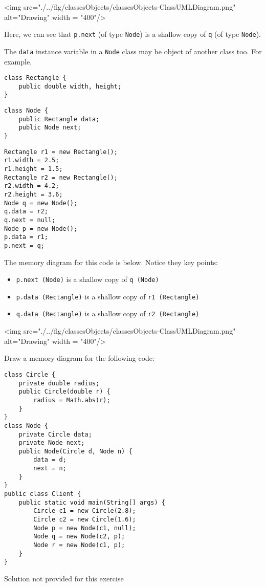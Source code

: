 \begin{center}
<img src="./../fig/classesObjects/classesObjects-ClassUMLDiagram.png" alt="Drawing" width = "400"/>
\end{center}

Here, we can see that \texttt{p.next} (of type \texttt{Node}) is a shallow copy of \texttt{q} (of type \texttt{Node}).

The \texttt{data} instance variable in a \texttt{Node} class may be object of another class too. For example,

\begin{lstlisting}
class Rectangle {
	public double width, height;
}  
\end{lstlisting}

\begin{lstlisting}
class Node {
	public Rectangle data;
	public Node next;
}
\end{lstlisting}

\begin{lstlisting}
Rectangle r1 = new Rectangle();
r1.width = 2.5;
r1.height = 1.5;
Rectangle r2 = new Rectangle();
r2.width = 4.2;
r2.height = 3.6;
Node q = new Node();
q.data = r2;
q.next = null;
Node p = new Node();
p.data = r1;
p.next = q;
\end{lstlisting}

The memory diagram for this code is below. Notice they key points:

\begin{itemize}
\item \texttt{p.next (Node)} is a shallow copy of \texttt{q (Node)}
\item \texttt{p.data (Rectangle)} is a shallow copy of \texttt{r1 (Rectangle)}
\item \texttt{q.data (Rectangle)} is a shallow copy of \texttt{r2 (Rectangle)}
\end{itemize}

\begin{center}
<img src="./../fig/classesObjects/classesObjects-ClassUMLDiagram.png" alt="Drawing" width = "400"/>
\end{center}

\begin{exercise}[5]
Draw a memory diagram for the following code:

\begin{lstlisting}[basicstyle=\small]
class Circle {
	private double radius;
	public Circle(double r) { 
		radius = Math.abs(r); 
	}
}
class Node {
	private Circle data;
	private Node next;
	public Node(Circle d, Node n) { 
		data = d; 
		next = n; 
	}
}
public class Client {
	public static void main(String[] args) {
		Circle c1 = new Circle(2.8);
		Circle c2 = new Circle(1.6);
		Node p = new Node(c1, null);
		Node q = new Node(c2, p);
		Node r = new Node(c1, p);
	}
}
\end{lstlisting}	
\end{exercise}
\begin{answer}
Solution not provided for this exercise	
\end{answer}

